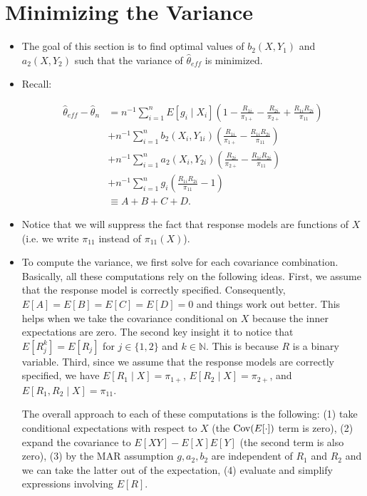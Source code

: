 
\section*{Minimizing the Variance}

\begin{itemize}
  \item The goal of this section is to find optimal values of $b_2(X, Y_1)$ and
    $a_2(X, Y_2)$ such that the variance of $\hat \theta_{eff}$ is minimized.

  \item Recall:

    \begin{align*}
      \hat \theta_{eff} - \hat \theta_n 
      &= n^{-1} \sum_{i = 1}^n E[g_i \mid X_i] \left(1 - \frac{R_{1i}}{\pi_{1+}}
      - \frac{R_{2i}}{\pi_{2+}} + \frac{R_{1i}R_{2i}}{\pi_{11}}\right) \\
      &+ n^{-1} \sum_{i = 1}^n b_2(X_i, Y_{1i}) \left(\frac{R_{1i}}{\pi_{1+}} -
      \frac{R_{1i}R_{2i}}{\pi_{11}}\right)\\
      &+ n^{-1} \sum_{i = 1}^n a_2(X_i, Y_{2i}) \left(\frac{R_{2i}}{\pi_{2+}} -
      \frac{R_{1i}R_{2i}}{\pi_{11}}\right)\\
      &+ n^{-1} \sum_{i = 1}^n g_i \left(\frac{R_{1i}R_{2i}}{\pi_{11}} -
      1\right) \\
      &\equiv A + B + C + D.
    \end{align*}

  \item Notice that we will suppress the fact that response models are functions
    of $X$ (i.e. we write $\pi_{11}$ instead of $\pi_{11}(X)$).
  
  \item To compute the variance, we first solve for each covariance combination.
    Basically, all these computations rely on the following ideas. First, we
    assume that the response model is correctly specified. Consequently,
    $E[A] = E[B] = E[C] = E[D] = 0$ and things work out better. This helps when
    we take the covariance conditional on $X$ because the inner expectations are
    zero. The second key insight it to notice that $E[R_{j}^k] = E[R_j]$ for $j
    \in \{1, 2\}$ and $k \in \mathbb{N}$. This is because $R$ is a binary
    variable. Third, since we assume that the response models are correctly
    specified, we have $E[R_1 \mid X] = \pi_{1+}$, $E[R_2 \mid X] = \pi_{2+}$,
    and $E[R_1, R_2 \mid X] = \pi_{11}$.

    The overall approach to each of these computations is the following:
    (1) take conditional expectations with respect to $X$ (the ${\text{Cov}}(E[\cdot])$
    term is zero), (2) expand the covariance to $E[XY] - E[X]E[Y]$ (the second
    term is also zero), (3) by the MAR assumption $g, a_2, b_2$ are independent
    of $R_1$ and $R_2$ and we can take the latter out of the expectation, (4)
    evaluate and simplify expressions involving $E[R]$.
  

\end{itemize}
